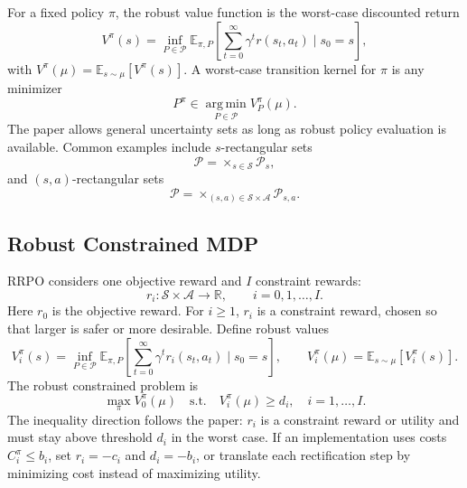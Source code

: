 \documentclass[11pt]{article}
\newcommand{\Sset}{\mathcal S}
\newcommand{\Aset}{\mathcal A}
\newcommand{\Pset}{\mathcal P}
\newcommand{\E}{\mathbb E}
\newcommand{\R}{\mathbb R}
\newcommand{\argmin}{\operatorname*{arg\,min}}
\newcommand{\1}{\mathbf 1}
\begin{document}
For a fixed policy $\pi$, the robust value function is the worst-case discounted return
\begin{equation}
    V^\pi(s)
    =\inf_{P\in\Pset}
    \E_{\pi,P}\!\left[\sum_{t=0}^{\infty}\gamma^t r(s_t,a_t)\mid s_0=s\right],
    \label{eq:robust-value-single}
\end{equation}
with $V^\pi(\mu)=\E_{s\sim\mu}[V^\pi(s)]$.  A worst-case transition kernel for $\pi$ is any minimizer
\begin{equation}
    P^\pi\in\argmin_{P\in\Pset} V_P^\pi(\mu).
\end{equation}
The paper allows general uncertainty sets as long as robust policy evaluation is available.  Common examples include $s$-rectangular sets
\begin{equation}
    \Pset=\times_{s\in\Sset}\Pset_s,
\end{equation}
and $(s,a)$-rectangular sets
\begin{equation}
    \Pset=\times_{(s,a)\in\Sset\times\Aset}\Pset_{s,a}.
\end{equation}

\subsection{Robust Constrained MDP}
RRPO considers one objective reward and $I$ constraint rewards:
\begin{equation}
    r_i:\Sset\times\Aset\to\R,
    \qquad i=0,1,\ldots,I.
\end{equation}
Here $r_0$ is the objective reward.  For $i\ge1$, $r_i$ is a constraint reward, chosen so that larger is safer or more desirable.  Define robust values
\begin{equation}
    V_i^\pi(s)
    =\inf_{P\in\Pset}\E_{\pi,P}\!\left[\sum_{t=0}^{\infty}\gamma^t r_i(s_t,a_t)\mid s_0=s\right],
    \qquad
    V_i^\pi(\mu)=\E_{s\sim\mu}[V_i^\pi(s)].
    \label{eq:robust-values-all}
\end{equation}
The robust constrained problem is
\begin{equation}
    \boxed{
    \max_\pi V_0^\pi(\mu)
    \quad\text{s.t.}\quad
    V_i^\pi(\mu)\ge d_i,
    \quad i=1,\ldots,I.}
    \label{eq:robust-constrained-problem}
\end{equation}
The inequality direction follows the paper: $r_i$ is a constraint reward or utility and must stay above threshold $d_i$ in the worst case.  If an implementation uses costs $C_i^\pi\le b_i$, set $r_i=-c_i$ and $d_i=-b_i$, or translate each rectification step by minimizing cost instead of maximizing utility.
\end{document}
